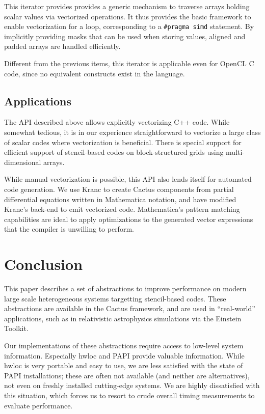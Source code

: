 \documentclass[conference]{IEEEtran}
\begin{document}
This iterator provides provides a generic mechanism to traverse arrays
holding scalar values via vectorized operations. It thus provides the
basic framework to enable vectorization for a loop,
corresponding to a \verb+#pragma simd+ statement. By implicitly
providing masks that can be used when storing values, aligned and
padded arrays are handled efficiently.

Different from the previous items, this iterator is applicable even
for OpenCL C code, since no equivalent constructs exist in the language.



\subsection{Applications}

The API described above allows explicitly vectorizing C++ code. While
somewhat tedious, it is in our experience straightforward to vectorize
a large class of scalar codes where vectorization is beneficial.
There is special support for efficient support of stencil-based
codes on block-structured grids using multi-dimensional arrays.

While manual vectorization is possible, this API also lends itself for
automated code generation. We use Kranc \cite{Husa:2004ip, Kranc:web}
to create Cactus components from partial differential equations
written in Mathematica notation, and have modified Kranc's back-end to
emit vectorized code. Mathematica's pattern matching capabilities are
ideal to apply optimizations to the generated vector expressions
that the compiler is unwilling to perform.



\section{Conclusion}

This paper describes a set of abstractions to improve performance on modern
large scale heterogeneous systems targetting stencil-based codes.
These abstractions are available in the Cactus framework, and are used
in ``real-world'' applications, such as in relativistic astrophysics
simulations via the Einstein Toolkit.

Our implementations of these abstractions require access to low-level
system information. Especially hwloc \cite{hwlocweb} and PAPI
\cite{papiweb} provide valuable information. While hwloc is very
portable and easy to use, we are less satisfied with the state of PAPI
installations; these are
often not available (and neither are alternatives),
not even on freshly installed cutting-edge
systems. We are highly dissatisfied with this situation, which
forces us to resort to crude overall timing measurements to evaluate
performance.
\end{document}
